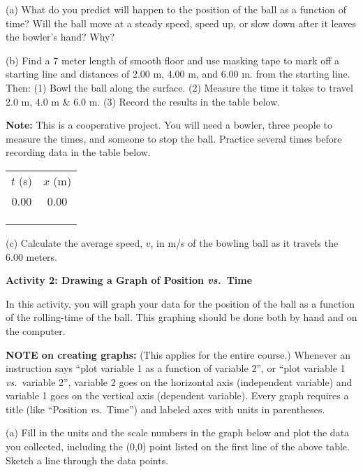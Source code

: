 (a) What do you predict will happen to the position of the ball as a function
of time? Will the ball move at a steady speed, speed up, or slow down after
it leaves the bowler's hand? Why?
\vspace{20mm}

(b) Find a 7 meter length of smooth floor and use masking tape to mark off a
starting line and distances of 2.00 m, 4.00 m, and 6.00 m. from the starting
line. Then: (1) Bowl the ball along the surface. (2) Measure the time it takes
to travel 2.0 m, 4.0 m \& 6.0 m. (3) Record the results in the table below.

\textbf{Note:} This is a cooperative project. You will need a bowler, three
people to measure the times, and someone to stop the ball. Practice several
times before recording data in the table below.

\vspace{0.2cm}
{\centering \begin{tabular}{|c|c|}
\hline 
$t$ (s)&
$x$ (m)\\
\hhline{|=|=|} 
0.00&
0.00\\
\hline 
&
\\
\hline 
&
\\
\hline 
&
\\
\hline 
\end{tabular}\par}
\vspace{0.2cm}

(c) Calculate the average speed, $v$, in m/s of the bowling ball as it travels
the 6.00 meters.
\answerspace{20mm}

\pagebreak[2]
\textbf{Activity 2: Drawing a Graph of Position \textit{vs.}~Time}

In this activity, you will graph your data for the position of the ball as
a function of the rolling-time of the ball. This graphing should be done both
by hand and on the computer.

\textbf{NOTE on creating graphs:} (This applies for the entire course.) Whenever an instruction says ``plot variable 1 as a function of variable 2'', or ``plot variable 1 \textit{vs.}~variable 2'', variable 2 goes on the horizontal axis (independent variable) and variable 1 goes on the vertical axis (dependent variable). Every graph requires a title (like ``Position \textit{vs.}~Time'') and labeled axes with units in parentheses.

(a) Fill in the units and the scale numbers in the graph below and plot the
data you collected, including the (0,0) point listed on the first line of the
above table.  Sketch a line through the data points.

